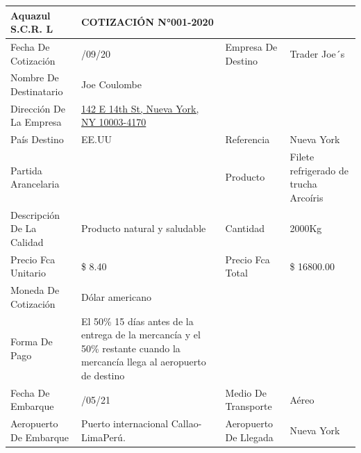 \documentclass[
  stu,
  floatsintext,
  longtable,
  a4paper,
  nolmodern,
  notxfonts,
  notimes,
  12pt,
  colorlinks=true,linkcolor=blue,citecolor=blue,urlcolor=blue]{apa7}
\newcounter{none} %
\begin{document}
{\def\LTcaptype{none} %
\begin{longtable}[]{@{}
  >{\raggedright\arraybackslash}p{}
  >{\raggedright\arraybackslash}p{}
  >{\raggedright\arraybackslash}p{}
  >{\raggedright\arraybackslash}p{}@{}}
\toprule\noalign{}
\begin{minipage}[b]{\linewidth}\raggedright
\textbf{Aquazul S.C.R. L}
\end{minipage} & \begin{minipage}[b]{\linewidth}\raggedright
COTIZACIÓN N°001-2020
\end{minipage} & \begin{minipage}[b]{\linewidth}\raggedright
\end{minipage} & \begin{minipage}[b]{\linewidth}\raggedright
\end{minipage} \\
\midrule\noalign{}
\endhead
\bottomrule\noalign{}
\endlastfoot
Fecha De Cotización & 21/09/20 & Empresa De Destino & Trader Joe´s \\
Nombre De Destinatario & Joe Coulombe & & \\
Dirección De La Empresa &
\href{https://www.tripadvisor.com.pe/Restaurant_Review-g60763-d1099366-Reviews-Trader_Joe-New_York_City_New_York.html\#MAPVIEW}{142
E 14th St, Nueva York, NY 10003-4170} & & \\
País Destino & EE.UU & Referencia & Nueva York \\
Partida Arancelaria & 304420000 & Producto & Filete refrigerado de
trucha Arcoíris \\
Descripción De La Calidad & Producto natural y saludable & Cantidad &
2000Kg \\
Precio Fca Unitario & \$ 8.40 & Precio Fca Total & \$ 16800.00 \\
Moneda De Cotización & Dólar americano & & \\
Forma De Pago & El 50\% 15 días antes de la entrega de la mercancía y el
50\% restante cuando la mercancía llega al aeropuerto de destino & & \\
Fecha De Embarque & 30/05/21 & Medio De Transporte & Aéreo \\
Aeropuerto De Embarque & Puerto internacional Callao-LimaPerú. &
Aeropuerto De Llegada & Nueva York \\
\end{longtable}
}
\end{document}
